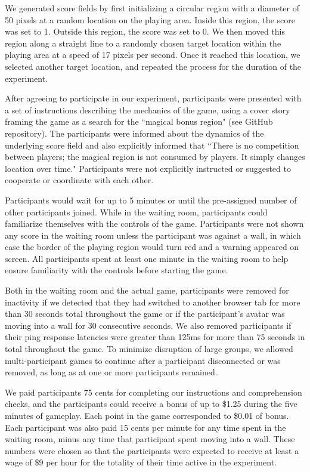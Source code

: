 \documentclass[12pt,letterpaper]{article}
\begin{document}
We generated score fields by first initializing a circular region with a diameter of 50 pixels at a random location on the playing area. 
Inside this region, the score was set to 1.
Outside this region, the score was set to 0.
We then moved this region along a straight line to a randomly chosen target location within the playing area at a speed of 17 pixels per second.
Once it reached this location, we selected another target location, and repeated the process for the duration of the experiment.

After agreeing to participate in our experiment, participants were presented with a set of instructions describing the mechanics of the game, using a cover story framing the game as a search for the ``magical bonus region" (see GitHub repository).  
The participants were informed about the dynamics of the underlying score field and also explicitly informed that ``There is no competition between players; the magical region is not consumed by players. It simply changes location over time." 
Participants were not explicitly instructed or suggested to cooperate or coordinate with each other.

Participants would wait for up to 5 minutes or until the pre-assigned number of other participants joined.
While in the waiting room, participants could familiarize themselves with the controls of the game.  Participants were not shown any score in
the waiting room unless the participant was against a wall, in which
case the border of the playing region would turn red and a warning appeared on screen.  All participants spent at least one minute in the waiting room to help ensure familiarity with the controls before starting the game. 

Both in the waiting room and the actual game, participants were removed for inactivity if we detected that they had switched to another browser tab for more than 30 seconds total throughout the game or if the participant's avatar was moving into a wall for 30 consecutive seconds.  
We also removed participants if their ping response latencies were greater than 125ms for more than 75 seconds in total throughout the game.  
To minimize disruption of large groups, we allowed multi-participant games to continue after a participant disconnected or was removed, as long as at one or more participants remained.

We paid participants 75 cents for completing our instructions and comprehension checks, and the participants could receive a bonus of up to \$1.25 during the five minutes of gameplay. Each point in the game corresponded to \$0.01 of bonus. Each participant was also paid 15 cents per minute for any time spent in the waiting room, minus any time that participant spent moving into a wall.  These numbers were chosen so that the participants were expected to receive at least a wage of \$9 per hour for the totality of their time active in the
experiment.
\end{document}
